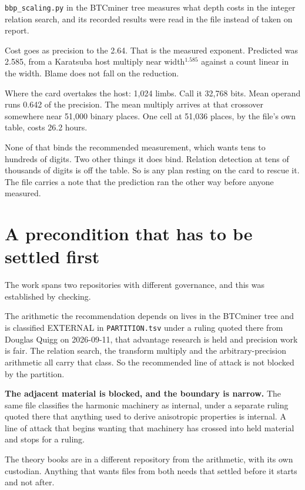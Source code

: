 \texttt{bbp\_scaling.py} in the BTCminer tree measures what depth costs in the integer relation
search, and its recorded results were read in the file instead of taken on report.

Cost goes as precision to the 2.64. That is the measured exponent. Predicted was 2.585, from a
Karatsuba host multiply near width$^{1.585}$ against a count linear in the width. Blame does not
fall on the reduction.

Where the card overtakes the host: 1{,}024 limbs. Call it 32{,}768 bits. Mean operand runs 0.642 of
the precision. The mean multiply arrives at that crossover somewhere near 51{,}000 binary places.
One cell at 51{,}036 places, by the file's own table, costs 26.2 hours.

None of that binds the recommended measurement, which wants tens to hundreds of digits. Two other
things it does bind. Relation detection at tens of thousands of digits is off the table. So is any
plan resting on the card to rescue it. The file carries a note that the prediction ran the other way
before anyone measured.

\section{A precondition that has to be settled first}

The work spans two repositories with different governance, and this was established by checking.

The arithmetic the recommendation depends on lives in the BTCminer tree and is classified EXTERNAL
in \texttt{PARTITION.\allowbreak{}tsv} under a ruling quoted there from Douglas Quigg on
2026-09-11, that advantage research is held and precision work is fair. The relation search, the
transform multiply and the arbitrary-precision arithmetic all carry that class. So the recommended
line of attack is not blocked by the partition.

\textbf{The adjacent material is blocked, and the boundary is narrow.} The same file classifies the
harmonic machinery as internal, under a separate ruling quoted there that anything used to derive
anisotropic properties is internal. A line of attack that begins wanting that machinery has crossed
into held material and stops for a ruling.

The theory books are in a different repository from the arithmetic, with its own custodian. Anything
that wants files from both needs that settled before it starts and not after.

